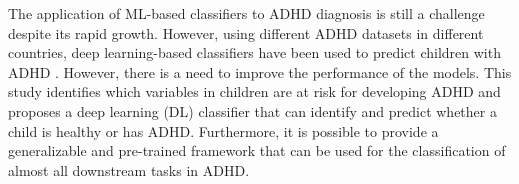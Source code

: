 The application of ML-based classifiers to ADHD diagnosis is still a challenge despite its rapid growth. However, using different ADHD datasets in different countries, deep learning-based classifiers have been used to predict children with ADHD \cite{ahmadi2021computer,kim2021can, zhang2021evidence}. However, there is a need to improve the performance of the models. This study identifies which variables in children are at risk for developing ADHD and proposes a deep learning (DL) classifier that can identify and predict whether a child is healthy or has ADHD. Furthermore, it is possible to provide a generalizable and pre-trained framework that can be used for the classification of almost all downstream tasks in ADHD.